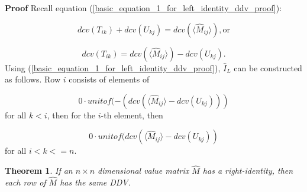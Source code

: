 \documentclass[10pt,letterpaper]{article}
\newtheorem{thm}{Theorem}[section]
\newenvironment{proof}{\noindent\textbf{Proof} }{\qed \newline}
\newcommand{\qed}{\nobreak \ifvmode \relax \else
      \ifdim\lastskip<1.5em \hskip-\lastskip
      \hskip1.5em plus0em minus0.5em \fi \nobreak
      \vrule height0.75em width0.5em depth0.25em\fi}
\numberwithin{equation}{section}
\begin{document}
\begin{proof}Recall equation
  (\ref{basic_equation_1_for_left_identity_ddv_proof}):

  \[ dcv(T_{ik}) + dcv(U_{kj}) = dcv( \langle \hat M_{ij} \rangle ) ,
  \mbox{or} \]

  \begin{equation} dcv(T_{ik}) = dcv( \langle \hat M_{ij} \rangle ) -
    dcv(U_{kj}) . \end{equation} Using
  (\ref{basic_equation_1_for_left_identity_ddv_proof}), $\hat I_L$ can
  be constructed as follows.  Row $i$ consists of elements of

  \[ 0 \cdot unitof( -(dcv( \langle \hat M_{ij} \rangle -
  dcv(U_{kj}))) \] for all $k < i$, then for the $i$-th element, then

  \[ 0 \cdot unitof( dcv( \langle \hat M_{ij} \rangle -
  dcv(U_{kj})) \] for all $i < k <= n$. \end{proof}

\begin{thm} \label{if_IR_then_same_row_ddvs} If an $n \times n$
  dimensional value matrix $\hat M$ has a right-identity, then each
  row of $\hat M$ has the same DDV.\end{thm}
\end{document}
